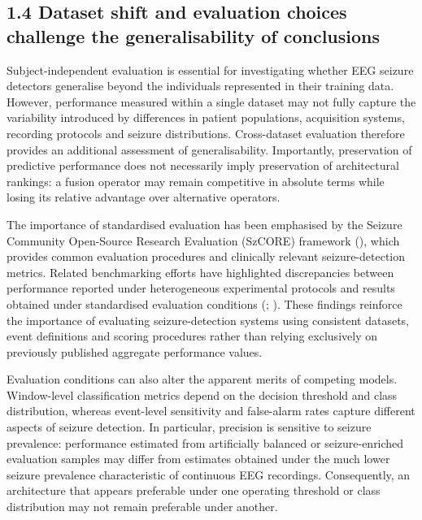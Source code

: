 \documentclass[11pt,a4paper]{article}
\begin{document}
\subsection{1.4 Dataset shift and evaluation choices challenge the generalisability of conclusions}\label{dataset-shift-and-evaluation-choices-challenge-the-generalisability-of-conclusions}

Subject-independent evaluation is essential for investigating whether EEG seizure
detectors generalise beyond the individuals represented in their training data. However,
performance measured within a single dataset may not fully capture the variability
introduced by differences in patient populations, acquisition systems, recording protocols
and seizure distributions. Cross-dataset evaluation therefore provides an additional
assessment of generalisability. Importantly, preservation of predictive performance does
not necessarily imply preservation of architectural rankings: a fusion operator may remain
competitive in absolute terms while losing its relative advantage over alternative
operators.

The importance of standardised evaluation has been emphasised by the Seizure Community
Open-Source Research Evaluation (SzCORE) framework (\citealp{Dan_2025}), which provides
common evaluation procedures and clinically relevant seizure-detection metrics. Related
benchmarking efforts have highlighted discrepancies between performance reported under
heterogeneous experimental protocols and results obtained under standardised evaluation
conditions (\citealp{Samanos_2025}; \citealp{Dan_2026}). These findings reinforce the importance
of evaluating seizure-detection systems using consistent datasets, event definitions and
scoring procedures rather than relying exclusively on previously published aggregate
performance values.

Evaluation conditions can also alter the apparent merits of competing models. Window-level
classification metrics depend on the decision threshold and class distribution, whereas
event-level sensitivity and false-alarm rates capture different aspects of seizure
detection. In particular, precision is sensitive to seizure prevalence: performance
estimated from artificially balanced or seizure-enriched evaluation samples may differ
from estimates obtained under the much lower seizure prevalence characteristic of
continuous EEG recordings. Consequently, an architecture that appears preferable under one
operating threshold or class distribution may not remain preferable under another.
\end{document}
